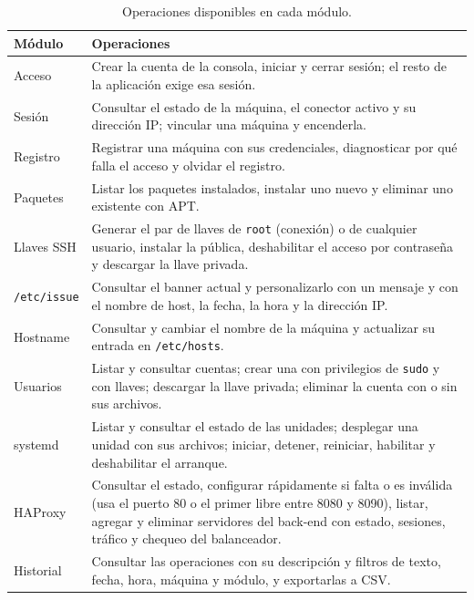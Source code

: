 \begin{table}[!t]
  \centering
  \caption{Operaciones disponibles en cada módulo.}
  \label{tab:capacidades}
  \footnotesize
  \begin{tabularx}{\columnwidth}{@{}l >{\raggedright\arraybackslash}X@{}}
    \hline
    Módulo & Operaciones \\
    \hline
    Acceso & Crear la cuenta de la consola, iniciar y cerrar sesión; el
    resto de la aplicación exige esa sesión. \\
    Sesión & Consultar el estado de la máquina, el conector activo y su
    dirección IP; vincular una máquina y encenderla. \\
    Registro & Registrar una máquina con sus credenciales, diagnosticar
    por qué falla el acceso y olvidar el registro. \\
    Paquetes & Listar los paquetes instalados, instalar uno nuevo y
    eliminar uno existente con APT. \\
    Llaves SSH & Generar el par de llaves de \texttt{root} (conexión) o de
    cualquier usuario, instalar la pública, deshabilitar el acceso por
    contraseña y descargar la llave privada. \\
    \texttt{/etc/issue} & Consultar el banner actual y personalizarlo con
    un mensaje y con el nombre de host, la fecha, la hora y la dirección
    IP. \\
    Hostname & Consultar y cambiar el nombre de la máquina y actualizar
    su entrada en \texttt{/etc/hosts}. \\
    Usuarios & Listar y consultar cuentas; crear una con privilegios de
    \texttt{sudo} y con llaves; descargar la llave privada; eliminar la
    cuenta con o sin sus archivos. \\
    systemd & Listar y consultar el estado de las unidades; desplegar una
    unidad con sus archivos; iniciar, detener, reiniciar, habilitar y
    deshabilitar el arranque. \\
    HAProxy & Consultar el estado, configurar rápidamente si falta o es
    inválida (usa el puerto 80 o el primer libre entre 8080 y 8090),
    listar, agregar y eliminar servidores del back-end con estado, sesiones,
    tráfico y chequeo del
    balanceador. \\
    Historial & Consultar las operaciones con su descripción y filtros
    de texto, fecha, hora, máquina y módulo, y exportarlas a CSV. \\
    \hline
  \end{tabularx}
\end{table}


